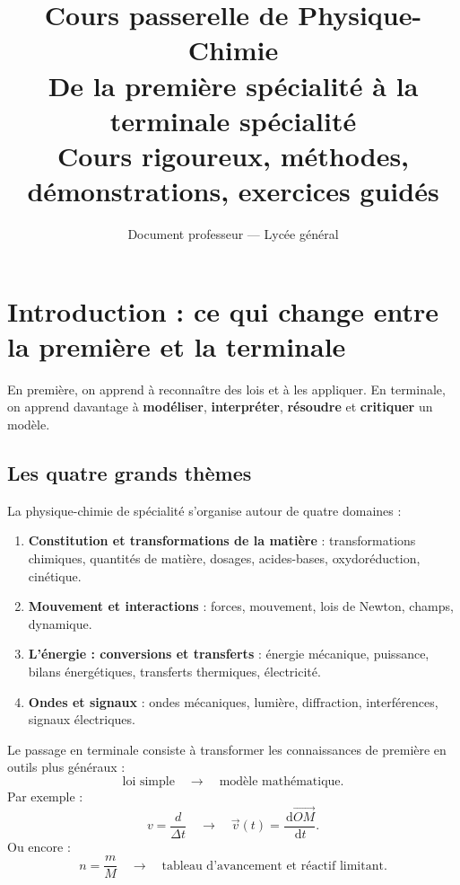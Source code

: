 \documentclass[11pt,a4paper]{article}
\title{
  \Huge\textbf{Cours passerelle de Physique-Chimie}\\[2mm]
  \Large De la première spécialité à la terminale spécialité\\[1mm]
  \large Cours rigoureux, méthodes, démonstrations, exercices guidés
}
\author{Document professeur — Lycée général}
\date{}
\newcommand{\important}[1]{\textbf{\textcolor{rougeprepa}{#1}}}
\newcommand{\dd}{\,\mathrm{d}}
\begin{document}
\maketitle

\tableofcontents
\newpage

\section{Introduction : ce qui change entre la première et la terminale}

\begin{objectif}
En première, on apprend à reconnaître des lois et à les appliquer.  
En terminale, on apprend davantage à \important{modéliser}, \important{interpréter}, \important{résoudre} et \important{critiquer} un modèle.
\end{objectif}

\subsection{Les quatre grands thèmes}

La physique-chimie de spécialité s'organise autour de quatre domaines :

\begin{enumerate}
  \item \textbf{Constitution et transformations de la matière} : transformations chimiques, quantités de matière, dosages, acides-bases, oxydoréduction, cinétique.
  \item \textbf{Mouvement et interactions} : forces, mouvement, lois de Newton, champs, dynamique.
  \item \textbf{L'énergie : conversions et transferts} : énergie mécanique, puissance, bilans énergétiques, transferts thermiques, électricité.
  \item \textbf{Ondes et signaux} : ondes mécaniques, lumière, diffraction, interférences, signaux électriques.
\end{enumerate}

\begin{transition}
Le passage en terminale consiste à transformer les connaissances de première en outils plus généraux :
\[
\text{loi simple} \quad \longrightarrow \quad \text{modèle mathématique}.
\]
Par exemple :
\[
v=\frac{d}{\Delta t}
\quad \longrightarrow \quad
\vec v(t)=\frac{\dd \vec{OM}}{\dd t}.
\]
Ou encore :
\[
n=\frac{m}{M}
\quad \longrightarrow \quad
\text{tableau d'avancement et réactif limitant}.
\]
\end{transition}
\end{document}
